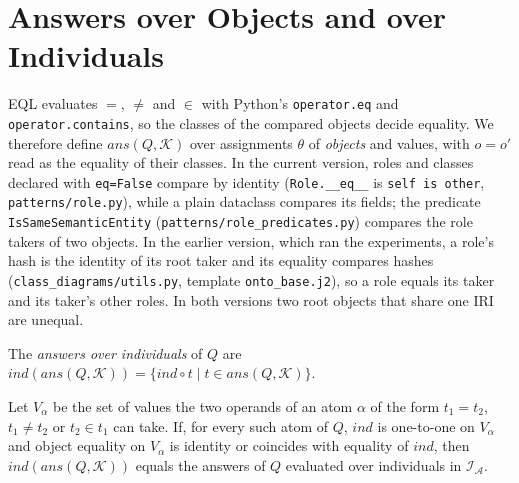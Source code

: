 
\section{Answers over Objects and over Individuals}
\label{sec:objects-individuals}

EQL evaluates $=$, $\neq$ and $\in$ with Python's \texttt{operator.eq} and
\texttt{operator.contains}, so the classes of the compared objects decide equality. We therefore
define $\mathit{ans}(Q,\mathcal{K})$ over assignments $\theta$ of \emph{objects} and values, with
$o=o'$ read as the equality of their classes. In the current version, roles and classes declared with \texttt{eq=False} compare by identity
(\texttt{Role.\_\_eq\_\_} is \texttt{self is other}, \texttt{patterns/role.py}), while a plain
dataclass compares its fields; the predicate \texttt{IsSameSemanticEntity}
(\texttt{patterns/role\_predicates.py}) compares the role takers of two objects. In the
earlier version, which ran the experiments, a role's hash is the identity of its root taker and
its equality compares hashes (\texttt{class\_diagrams/utils.py}, template \texttt{onto\_base.j2}),
so a role equals its taker and its taker's other roles. In both versions two root objects that
share one IRI are unequal.

\begin{definition}
The \emph{answers over individuals} of $Q$ are
$\mathit{ind}(\mathit{ans}(Q,\mathcal{K}))=\{\mathit{ind}\circ t \mid t\in\mathit{ans}(Q,\mathcal{K})\}$.
\end{definition}

\begin{proposition}
\label{prop:objects-individuals}
Let $V_\alpha$ be the set of values the two operands of an atom $\alpha$ of the form $t_1=t_2$,
$t_1\neq t_2$ or $t_2\in t_1$ can take. If, for every such atom of $Q$, $\mathit{ind}$ is
one-to-one on $V_\alpha$ and object equality on $V_\alpha$ is identity or coincides with equality
of $\mathit{ind}$, then $\mathit{ind}(\mathit{ans}(Q,\mathcal{K}))$ equals the answers of $Q$
evaluated over individuals in $\mathcal{I}_{\mathcal{A}}$.
\end{proposition}


